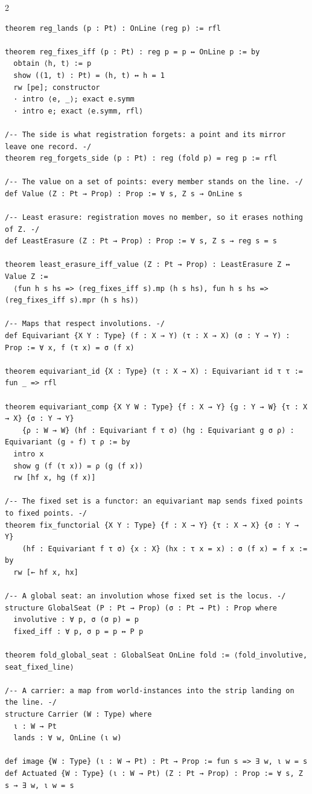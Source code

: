 \documentclass[10pt]{article}
\begin{document}
\begin{multicols}{2}
\begin{Verbatim}[fontsize=\fontsize{5.9}{6.8}\selectfont,breaklines,breakanywhere,breaksymbolleft={}]
theorem reg_lands (p : Pt) : OnLine (reg p) := rfl

theorem reg_fixes_iff (p : Pt) : reg p = p ↔ OnLine p := by
  obtain ⟨h, t⟩ := p
  show ((1, t) : Pt) = (h, t) ↔ h = 1
  rw [pe]; constructor
  · intro ⟨e, _⟩; exact e.symm
  · intro e; exact ⟨e.symm, rfl⟩

/-- The side is what registration forgets: a point and its mirror leave one record. -/
theorem reg_forgets_side (p : Pt) : reg (fold p) = reg p := rfl

/-- The value on a set of points: every member stands on the line. -/
def Value (Z : Pt → Prop) : Prop := ∀ s, Z s → OnLine s

/-- Least erasure: registration moves no member, so it erases nothing of Z. -/
def LeastErasure (Z : Pt → Prop) : Prop := ∀ s, Z s → reg s = s

theorem least_erasure_iff_value (Z : Pt → Prop) : LeastErasure Z ↔ Value Z :=
  ⟨fun h s hs => (reg_fixes_iff s).mp (h s hs), fun h s hs => (reg_fixes_iff s).mpr (h s hs)⟩

/-- Maps that respect involutions. -/
def Equivariant {X Y : Type} (f : X → Y) (τ : X → X) (σ : Y → Y) : Prop := ∀ x, f (τ x) = σ (f x)

theorem equivariant_id {X : Type} (τ : X → X) : Equivariant id τ τ := fun _ => rfl

theorem equivariant_comp {X Y W : Type} {f : X → Y} {g : Y → W} {τ : X → X} {σ : Y → Y}
    {ρ : W → W} (hf : Equivariant f τ σ) (hg : Equivariant g σ ρ) : Equivariant (g ∘ f) τ ρ := by
  intro x
  show g (f (τ x)) = ρ (g (f x))
  rw [hf x, hg (f x)]

/-- The fixed set is a functor: an equivariant map sends fixed points to fixed points. -/
theorem fix_functorial {X Y : Type} {f : X → Y} {τ : X → X} {σ : Y → Y}
    (hf : Equivariant f τ σ) {x : X} (hx : τ x = x) : σ (f x) = f x := by
  rw [← hf x, hx]

/-- A global seat: an involution whose fixed set is the locus. -/
structure GlobalSeat (P : Pt → Prop) (σ : Pt → Pt) : Prop where
  involutive : ∀ p, σ (σ p) = p
  fixed_iff : ∀ p, σ p = p ↔ P p

theorem fold_global_seat : GlobalSeat OnLine fold := ⟨fold_involutive, seat_fixed_line⟩

/-- A carrier: a map from world-instances into the strip landing on the line. -/
structure Carrier (W : Type) where
  ι : W → Pt
  lands : ∀ w, OnLine (ι w)

def image {W : Type} (ι : W → Pt) : Pt → Prop := fun s => ∃ w, ι w = s
def Actuated {W : Type} (ι : W → Pt) (Z : Pt → Prop) : Prop := ∀ s, Z s → ∃ w, ι w = s


\end{Verbatim}
\end{multicols}
\end{document}
